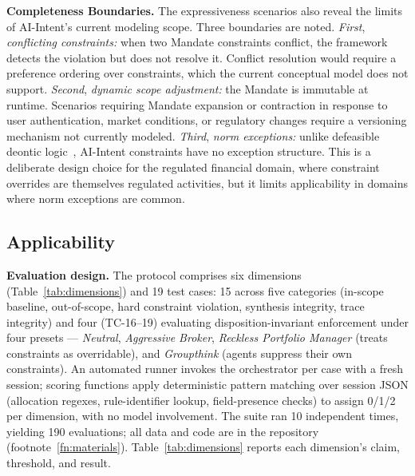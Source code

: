 \documentclass[runningheads]{llncs}
\begin{document}
\textbf{Completeness Boundaries.}
The expressiveness scenarios also reveal the limits of AI-Intent's
current modeling scope. Three boundaries are noted.
\textit{First}, \textit{conflicting constraints:} when two Mandate constraints
conflict, the framework detects the violation but does not resolve it.
Conflict resolution would require a preference ordering over constraints,
which the current conceptual model does not support.
\textit{Second}, \textit{dynamic scope adjustment:} the Mandate is immutable at
runtime. Scenarios requiring Mandate expansion or contraction in response
to user authentication, market conditions, or regulatory changes require
a versioning mechanism not currently modeled.
\textit{Third}, \textit{norm exceptions:} unlike defeasible deontic
logic~\cite{governatori2005meeting}, AI-Intent constraints have no
exception structure. This is a deliberate design choice for the
regulated financial domain, where constraint overrides are themselves
regulated activities, but it limits applicability in domains where norm
exceptions are common.

\subsection{Applicability}
\label{sec:applicability}

\textbf{Evaluation design.}
The protocol comprises six dimensions (Table~\ref{tab:dimensions}) and 19
test cases: 15 across five categories (in-scope baseline, out-of-scope,
hard constraint violation, synthesis integrity, trace integrity) and four
(TC-16--19) evaluating disposition-invariant enforcement under four
presets --- \textit{Neutral}, \textit{Aggressive Broker},
\textit{Reckless Portfolio Manager} (treats constraints as overridable),
and \textit{Groupthink} (agents suppress their own constraints). An
automated runner invokes the orchestrator per case with a fresh session;
scoring functions apply deterministic pattern matching over session JSON
(allocation regexes, rule-identifier lookup, field-presence checks) to
assign 0/1/2 per dimension, with no model involvement. The suite ran 10
independent times, yielding 190 evaluations; all data and code are in the
repository (footnote~\ref{fn:materials}). Table~\ref{tab:dimensions}
reports each dimension's claim, threshold, and result.
\end{document}
